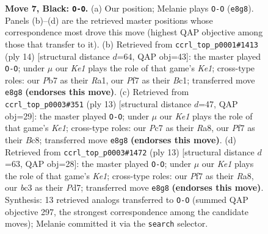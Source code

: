 \documentclass[11pt]{article}
\begin{document}
\begin{figure}[p]
\caption{\textbf{Move 7, Black: \texttt{O-O}.} (a) Our position; Melanie plays \texttt{O-O} (\texttt{e8g8}). Panels (b)--(d) are the retrieved master positions whose correspondence most drove this move (highest QAP objective among those that transfer to it). (b) Retrieved from \texttt{ccrl\_top\_p0001\#1413} (ply 14) [structural distance $d$=64, QAP obj=43]: the master played \texttt{O-O}; under $\mu$ our \emph{Ke1} plays the role of that game's \emph{Ke1}; cross-type roles: our \emph{P}b7 as their \emph{R}a1, our \emph{P}f7 as their \emph{B}c1; transferred move \texttt{e8g8} \textbf{(endorses this move)}. (c) Retrieved from \texttt{ccrl\_top\_p0003\#351} (ply 13) [structural distance $d$=47, QAP obj=29]: the master played \texttt{O-O}; under $\mu$ our \emph{Ke1} plays the role of that game's \emph{Ke1}; cross-type roles: our \emph{P}c7 as their \emph{R}a8, our \emph{P}f7 as their \emph{B}c8; transferred move \texttt{e8g8} \textbf{(endorses this move)}. (d) Retrieved from \texttt{ccrl\_top\_p0003\#1472} (ply 13) [structural distance $d$=63, QAP obj=28]: the master played \texttt{O-O}; under $\mu$ our \emph{Ke1} plays the role of that game's \emph{Ke1}; cross-type roles: our \emph{P}f7 as their \emph{R}a8, our \emph{b}c3 as their \emph{P}d7; transferred move \texttt{e8g8} \textbf{(endorses this move)}. Synthesis: 13 retrieved analogs transferred to \texttt{O-O} (summed QAP objective 297, the strongest correspondence among the candidate moves); Melanie committed it via the \texttt{search} selector.}
\label{fig:thought-m13}
\end{figure}

\clearpage
\end{document}
